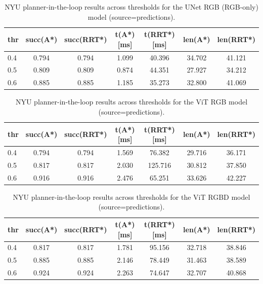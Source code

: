 \begin{table}[H]
  \centering
  \caption{NYU planner-in-the-loop results across thresholds for the UNet RGB (RGB-only) model (source=predictions).}
  \label{tab:nyu_planner_pred_unet_rgb}
  \begin{tabular}{lcccccc}
    \toprule
    thr & succ(A*) & succ(RRT*) & t(A*) [ms] & t(RRT*) [ms] & len(A*) & len(RRT*) \\
    \midrule
    0.4 & 0.794 & 0.794 & 1.099 & 40.396 & 34.702 & 41.121 \\
    0.5 & 0.809 & 0.809 & 0.874 & 44.351 & 27.927 & 34.212 \\
    0.6 & 0.885 & 0.885 & 1.185 & 35.273 & 32.800 & 41.069 \\
    \bottomrule
  \end{tabular}
\end{table}

\begin{table}[H]
  \centering
  \caption{NYU planner-in-the-loop results across thresholds for the ViT RGB model (source=predictions).}
  \label{tab:nyu_planner_pred_vit}
  \begin{tabular}{lcccccc}
    \toprule
    thr & succ(A*) & succ(RRT*) & t(A*) [ms] & t(RRT*) [ms] & len(A*) & len(RRT*) \\
    \midrule
    0.4 & 0.794 & 0.794 & 1.569 & 76.382 & 29.716 & 36.171 \\
    0.5 & 0.817 & 0.817 & 2.030 & 125.716 & 30.812 & 37.850 \\
    0.6 & 0.916 & 0.916 & 2.476 & 65.251 & 33.626 & 42.227 \\
    \bottomrule
  \end{tabular}
\end{table}

\begin{table}[H]
  \centering
  \caption{NYU planner-in-the-loop results across thresholds for the ViT RGBD model (source=predictions).}
  \label{tab:nyu_planner_pred_vit_rgb}
  \begin{tabular}{lcccccc}
    \toprule
    thr & succ(A*) & succ(RRT*) & t(A*) [ms] & t(RRT*) [ms] & len(A*) & len(RRT*) \\
    \midrule
    0.4 & 0.817 & 0.817 & 1.781 & 95.156 & 32.718 & 38.846 \\
    0.5 & 0.885 & 0.885 & 2.146 & 78.449 & 31.463 & 38.589 \\
    0.6 & 0.924 & 0.924 & 2.263 & 74.647 & 32.707 & 40.868 \\
    \bottomrule
  \end{tabular}
\end{table}

